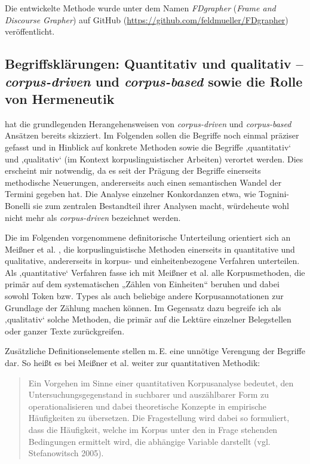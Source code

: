 Die entwickelte Methode wurde unter dem Namen \emph{FDgrapher} (\emph{Frame and Discourse Grapher}) auf GitHub (\url{https://github.com/feldmueller/FDgrapher}) veröffentlicht.

\subsection{\texorpdfstring{Begriffsklärungen: Quantitativ und qualitativ -- \emph{corpus-driven} und \emph{corpus-based} sowie die Rolle von Hermeneutik}{Begriffsklärungen: Quantitativ und qualitativ -- corpus-driven und corpus-based sowie die Rolle von Hermeneutik}}\label{begriffsklaerungen-quantitativ-und-qualitativ-corpus-driven-und-corpus-based-sowie-die-rolle-von-hermeneutik}

 hat die grundlegenden Herangehensweisen von \emph{corpus-driven} und \emph{corpus-based} Ansätzen bereits skizziert. Im Folgenden sollen die Begriffe noch einmal präziser gefasst und in Hinblick auf konkrete Methoden sowie die Begriffe ‚quantitativ` und ‚qualitativ` (im Kontext korpuslinguistischer Arbeiten) verortet werden. Dies erscheint mir notwendig, da es seit der Prägung der Begriffe einerseits methodische Neuerungen, andererseits auch einen semantischen Wandel der Termini gegeben hat. Die Analyse einzelner Konkordanzen etwa, wie Tognini-Bonelli \autocite*{tognini-bonelliCorpusLinguisticsWork2001} sie zum zentralen Bestandteil ihrer Analysen macht, würdeheute wohl nicht mehr als \emph{corpus-driven} bezeichnet werden.

Die im Folgenden vorgenommene definitorische Unterteilung orientiert sich an Meißner et al. \autocite*{meissnerKorpusanalyse2016}, die korpuslinguistische Methoden einerseits in quantitative und qualitative, andererseits in korpus- und einheitenbezogene Verfahren unterteilen. Als ‚quantitative` Verfahren fasse ich mit Meißner et al. \autocite*[309]{meissnerKorpusanalyse2016} alle Korpusmethoden, die primär auf dem systematischen „Zählen von Einheiten`` beruhen und dabei sowohl Token bzw. Types als auch beliebige andere Korpusannotationen zur Grundlage der Zählung machen können. Im Gegensatz dazu begreife ich als ‚qualitativ` solche Methoden, die primär auf die Lektüre einzelner Belegstellen oder ganzer Texte zurückgreifen.

Zusätzliche Definitionselemente stellen m.\,E. eine unnötige Verengung der Begriffe dar. So heißt es bei Meißner et al. weiter zur quantitativen Methodik:

\begin{quote}
Ein Vorgehen im Sinne einer quantitativen Korpusanalyse bedeutet, den Untersuchungsgegenstand in suchbarer und auszählbarer Form zu operationalisieren und dabei theoretische Konzepte in empirische Häufigkeiten zu übersetzen. Die Fragestellung wird dabei so formuliert, dass die Häufigkeit, welche im Korpus unter den in Frage stehenden Bedingungen ermittelt wird, die abhängige Variable darstellt (vgl. Stefanowitsch 2005). \autocite[309]{meissnerKorpusanalyse2016}
\end{quote}

